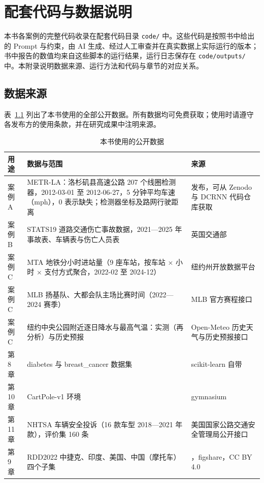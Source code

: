 \chapter{配套代码与数据说明}
\label{app:code}

本书各案例的完整代码收录在配套代码目录 \texttt{code/} 中。这些代码是按照书中给出的 Prompt 与约束，由 AI 生成、经过人工审查并在真实数据上实际运行的版本；书中报告的数值均来自这些脚本的运行结果，运行日志保存在 \texttt{code/outputs/} 中。本附录说明数据来源、运行方法和代码与章节的对应关系。

\section{数据来源}

表~\ref{tab:app_data} 列出了本书使用的全部公开数据。所有数据均可免费获取；使用时请遵守各发布方的使用条款，并在研究成果中注明来源。

\begin{table}[H]
\centering
\caption{本书使用的公开数据}
\label{tab:app_data}
\small
\begin{tabular}{p{2.2cm}p{5.6cm}p{5.2cm}}
\toprule
用途 & 数据与范围 & 来源 \\
\midrule
案例 A & METR-LA：洛杉矶县高速公路 207 个线圈检测器，2012-03-01 至 2012-06-27，5 分钟平均车速（mph），0 表示缺失；检测器坐标及路网行驶距离 & \citet{li2018dcrnn} 发布，可从 Zenodo 与 DCRNN 代码仓库获取 \\
案例 B & STATS19 道路交通伤亡事故数据，2021—2025 年事故表、车辆表与伤亡人员表 & 英国交通部\cite{dft2026stats19} \\
案例 C & MTA 地铁分小时进站量（9 座车站，按车站 $\times$ 小时 $\times$ 支付方式聚合，2022-02 至 2024-12） & 纽约州开放数据平台\cite{mta2025hourly} \\
案例 C & MLB 扬基队、大都会队主场比赛时间（2022—2024 赛季） & MLB 官方赛程接口 \\
案例 C & 纽约中央公园附近逐日降水与最高气温：实测（再分析）与历史预报 & Open-Meteo 历史天气与历史预报接口\cite{openmeteo2026} \\
第 8 章 & diabetes 与 breast\_cancer 数据集 & scikit-learn 自带 \\
第 10 章 & CartPole-v1 环境 & gymnasium \\
第 11 章 & NHTSA 车辆安全投诉（16 款车型 2018—2021 年款），评价集 160 条 & 美国国家公路交通安全管理局公开接口\cite{nhtsa2026complaints} \\
第 9 章 & RDD2022 中捷克、印度、美国、中国（摩托车）四个子集 & \citet{arya2022rdd}，figshare，CC BY 4.0 \\
\bottomrule
\end{tabular}
\end{table}

